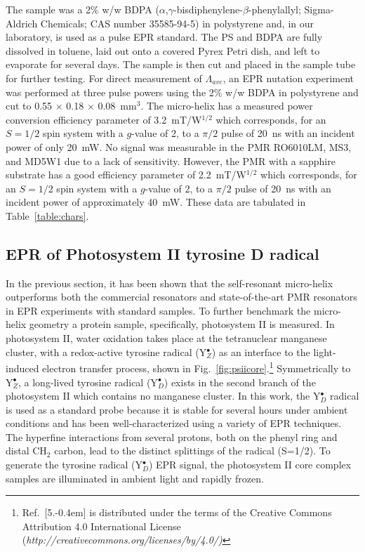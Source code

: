 The sample was a 2\% w/w BDPA ($\alpha$,$\gamma$-bisdiphenylene-$\beta$-phenylallyl; Sigma-Aldrich Chemicals; CAS number 35585-94-5) in polystyrene and, in our laboratory, is used as a pulse EPR standard. The PS and BDPA are fully dissolved in toluene, laid out onto a covered Pyrex Petri dish, and left to evaporate for several days. The sample is then cut and placed in the sample tube for further testing. For direct measurement of $\Lambda_{ave}$, an EPR nutation experiment was performed at three pulse powers using the 2\% w/w BDPA in polystyrene and cut to 0.55 $\times$ 0.18 $\times$ 0.08~mm$^3$. The micro-helix has a measured power conversion efficiency parameter of 3.2~mT/W$^{1/2}$ which corresponds, for an $S=1/2$ spin system with a $g$-value of 2, to a $\pi/2$ pulse of 20~ns with an incident power of only 20~mW. No signal was measurable in the PMR RO6010LM, MS3, and MD5W1 due to a lack of sensitivity. However, the PMR with a sapphire substrate has a good efficiency parameter of 2.2~mT/W$^{1/2}$ which corresponds, for an $S=1/2$ spin system with a $g$-value of 2, to a $\pi/2$ pulse of 20~ns with an incident power of approximately 40~mW. These data are tabulated in Table~\ref{table:chars}.

\subsection{EPR of Photosystem II tyrosine D radical}
In the previous section, it has been shown that the self-resonant micro-helix outperforms both the commercial resonators and state-of-the-art PMR resonators in EPR experiments with standard samples. To further benchmark the micro-helix geometry a protein sample, specifically, photosystem II is measured. In photosystem II, water oxidation takes place at the tetranuclear manganese cluster, with a redox-active tyrosine radical (Y$_Z^\bullet$) as an interface to the light-induced electron transfer process, \cite{Lubitz2019} shown in Fig.~\ref{fig:psiicore}.\footnote{\label{CCnotRef} Ref.~[5.\kern-0.4em] is distributed under the terms of the Creative Commons Attribution 4.0 International License (\textit{http://creativecommons.org/licenses/by/4.0/)}} Symmetrically to Y$_Z^\bullet$, a long-lived tyrosine radical (Y$_D^\bullet$) exists in the second branch of the photosystem II which contains no manganese cluster. In this work, the Y$_D^\bullet$ radical is used as a standard probe because it is stable for several hours under ambient conditions\cite{Saito7690} and has been well-characterized using a variety of EPR techniques. \cite{Hofbauer6623, STYRING201276} The hyperfine interactions from several protons, both on the phenyl ring and distal CH$_2$ carbon, lead to the distinct splittings of the radical (S=1/2). To generate the tyrosine radical (Y$_D^\bullet$) EPR signal, the photosystem II core complex samples are illuminated in ambient light and rapidly frozen. 

